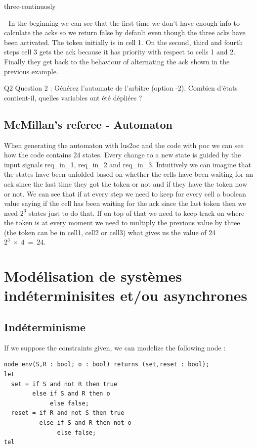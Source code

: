 \documentclass{article}
\begin{document}
three-continuosly

- In the beginning we can see that the first time we don't have enough info
to calculate the acks so we return false by default even though the three
acks have been activated. The token initially is in cell 1. On the second, third
and fourth steps cell 3 gets the ack because it has priority with respect to cells 
1 and 2. Finally they get back to the behaviour of alternating the ack shown in the
previous example.

Q2 Question 2 : Générez l'automate de l'arbitre (option -2). Combien d'états contient-il, quelles variables ont été dépliées ?

\subsection{McMillan's referee - Automaton}

When generating the automaton with lus2oc and the code with poc we can see how
the code contains 24 states. Every change to a new state is guided by the input
signals req\_in\_1, req\_in\_2 and req\_in\_3. Intuitively we can imagine that
the states have been unfolded based on whether the cells have been waiting for
an ack since the last time they got the token or not and if they have the token
now or not. We can see that if at every step we need to keep for every cell
a boolean value saying if the cell has been waiting for the ack since the last
token then we need $2^{3}$ states just to do that. If on top of that we need
to keep track on where the token is at every moment we need to multiply the 
previous value by three (the token can be in cell1, cell2 or cell3) what
gives us the value of 24 $2^{3}~\times~4~=~24$.

\section{Modélisation de systèmes indéterminisites et/ou asynchrones}

\subsection{Indéterminisme}

If we suppose the constraints given, we can modelize the following node :

\begin{verbatim}
node env(S,R : bool; o : bool) returns (set,reset : bool);
let
  set = if S and not R then true
        else if S and R then o
             else false;
  reset = if R and not S then true
          else if S and R then not o
               else false;
tel
\end{verbatim}
\end{document}
